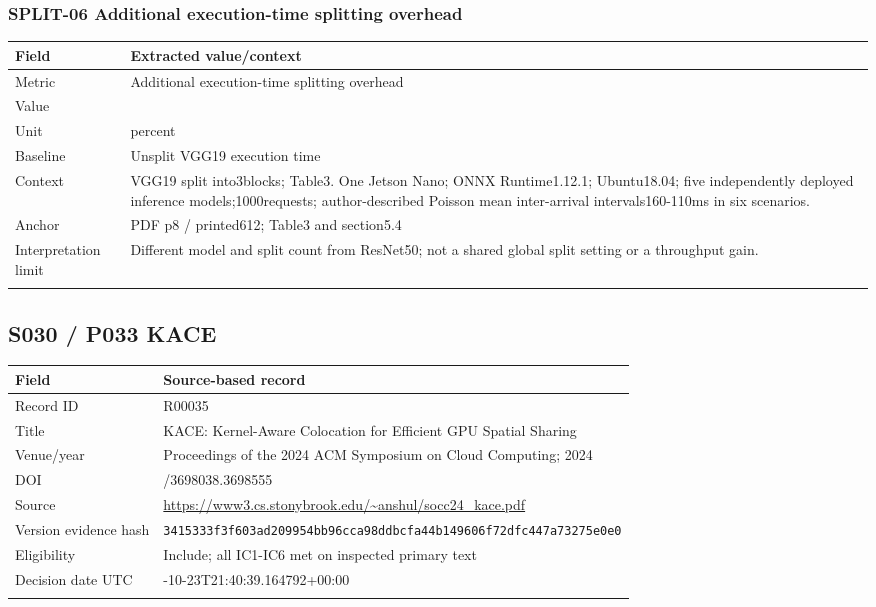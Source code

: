 \subsubsection*{SPLIT-06 Additional execution-time splitting overhead}
\begin{longtable}{>{\raggedright\arraybackslash}p{}>{\raggedright\arraybackslash}p{}}
\toprule
\textbf{Field} & \textbf{Extracted value/context}\\\midrule\endhead
Metric & Additional execution-time splitting overhead\\\addlinespace
Value & 18.1\\\addlinespace
Unit & percent\\\addlinespace
Baseline & Unsplit VGG19 execution time\\\addlinespace
Context & VGG19 split into3blocks;\allowbreak{} Table3. One Jetson Nano;\allowbreak{} ONNX Runtime1.12.1;\allowbreak{} Ubuntu18.04;\allowbreak{} five independently deployed inference models;\allowbreak{}1000requests;\allowbreak{} author-described Poisson mean inter-arrival intervals160-110ms in six scenarios.\\\addlinespace
Anchor & PDF p8 / printed612;\allowbreak{} Table3 and section5.4\\\addlinespace
Interpretation limit & Different model and split count from ResNet50;\allowbreak{} not a shared global split setting or a throughput gain.\\\addlinespace
\bottomrule\end{longtable}
\clearpage\subsection{S030 / P033 KACE}
\cite{s030}
\begin{longtable}{>{\raggedright\arraybackslash}p{}>{\raggedright\arraybackslash}p{}}
\toprule
\textbf{Field} & \textbf{Source-based record}\\\midrule\endhead
Record ID & R00035\\\addlinespace
Title & KACE: Kernel-Aware Colocation for Efficient GPU Spatial Sharing\\\addlinespace
Venue/year & Proceedings of the 2024 ACM Symposium on Cloud Computing;\allowbreak{} 2024\\\addlinespace
DOI & 10.1145/3698038.3698555\\\addlinespace
Source & \url{https://www3.cs.stonybrook.edu/~anshul/socc24_kace.pdf}\\\addlinespace
Version evidence hash & \nolinkurl{3415333f3f603ad209954bb96cca98ddbcfa44b149606f72dfc447a73275e0e0}\\\addlinespace
Eligibility & Include;\allowbreak{} all IC1-IC6 met on inspected primary text\\\addlinespace
Decision date UTC & 2026-10-23T21:40:39.164792+00:00\\\addlinespace
\bottomrule\end{longtable}
